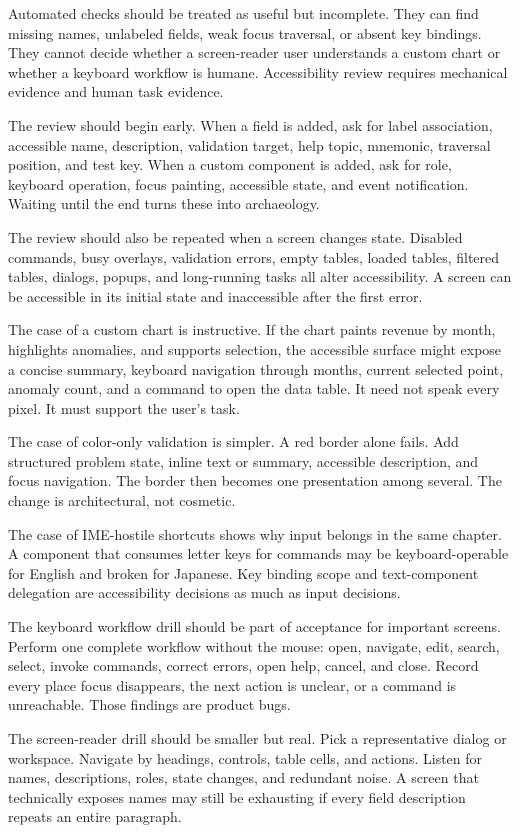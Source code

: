 Automated checks should be treated as useful but incomplete. They can find missing names, unlabeled fields, weak focus traversal, or absent key bindings. They cannot decide whether a screen-reader user understands a custom chart or whether a keyboard workflow is humane. Accessibility review requires mechanical evidence and human task evidence.

The review should begin early. When a field is added, ask for label association, accessible name, description, validation target, help topic, mnemonic, traversal position, and test key. When a custom component is added, ask for role, keyboard operation, focus painting, accessible state, and event notification. Waiting until the end turns these into archaeology.

The review should also be repeated when a screen changes state. Disabled commands, busy overlays, validation errors, empty tables, loaded tables, filtered tables, dialogs, popups, and long-running tasks all alter accessibility. A screen can be accessible in its initial state and inaccessible after the first error.

The case of a custom chart is instructive. If the chart paints revenue by month, highlights anomalies, and supports selection, the accessible surface might expose a concise summary, keyboard navigation through months, current selected point, anomaly count, and a command to open the data table. It need not speak every pixel. It must support the user's task.

The case of color-only validation is simpler. A red border alone fails. Add structured problem state, inline text or summary, accessible description, and focus navigation. The border then becomes one presentation among several. The change is architectural, not cosmetic.

The case of IME-hostile shortcuts shows why input belongs in the same chapter. A component that consumes letter keys for commands may be keyboard-operable for English and broken for Japanese. Key binding scope and text-component delegation are accessibility decisions as much as input decisions.

The keyboard workflow drill should be part of acceptance for important screens. Perform one complete workflow without the mouse: open, navigate, edit, search, select, invoke commands, correct errors, open help, cancel, and close. Record every place focus disappears, the next action is unclear, or a command is unreachable. Those findings are product bugs.

The screen-reader drill should be smaller but real. Pick a representative dialog or workspace. Navigate by headings, controls, table cells, and actions. Listen for names, descriptions, roles, state changes, and redundant noise. A screen that technically exposes names may still be exhausting if every field description repeats an entire paragraph.

